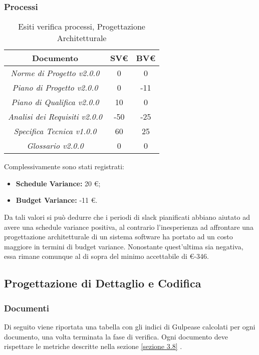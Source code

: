 \subsubsection{Processi}
\label{appendice 4}
\vspace{3mm}

\begin{table}[h]
	\begin{tabular}{|c|c|c|}
		\toprule
			\textbf{Documento} & \textbf{SV\euro} & \textbf{BV\euro} \\ 
		\midrule
		\midrule
			\textit{Norme di Progetto v2.0.0} & 0 & 0 \\  
			\textit{Piano di Progetto v2.0.0} & 0 & -11 \\ 
			\textit{Piano di Qualifica v2.0.0} & 10 & 0 \\ 
			\textit{Analisi dei Requisiti v2.0.0} & -50 & -25 \\
			\textit{Specifica Tecnica v1.0.0} & 60 & 25 \\ 
			\textit{Glossario v2.0.0} & 0 & 0 \\ 
		\bottomrule
	\end{tabular}
\caption{Esiti verifica processi, Progettazione Architetturale}
\end{table}

\noindent Complessivamente sono stati registrati:
\begin{itemize}
	\item \textbf{Schedule Variance:} 20 \euro;
	\item \textbf{Budget Variance:} -11 \euro.
\end{itemize}

\noindent Da tali valori si può dedurre che i periodi di slack pianificati abbiano aiutato ad avere una schedule variance positiva, al contrario l'inesperienza ad affrontare una progettazione architetturale di un sistema software ha portato ad un costo maggiore in termini di budget variance. Nonostante quest'ultima sia negativa, essa rimane comunque al di sopra del minimo accettabile di \euro -346.


\subsection{Progettazione di Dettaglio e Codifica}
\subsubsection{Documenti}
\label{appendice 5}

Di seguito viene riportata una tabella con gli indici di Gulpease calcolati per ogni documento, una volta terminata la fase di verifica. Ogni documento deve rispettare le metriche descritte nella sezione \ref{sezione 3.8} .\\

